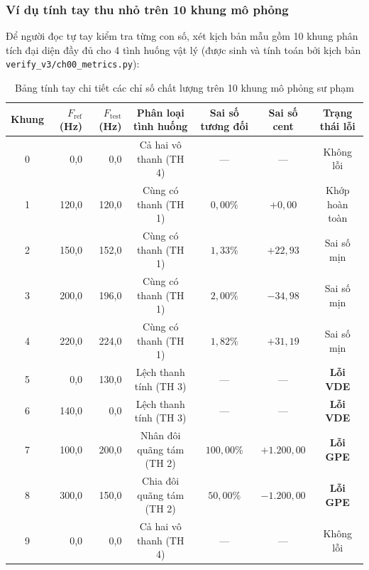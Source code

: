\subsubsection*{Ví dụ tính tay thu nhỏ trên 10 khung mô phỏng}
Để người đọc tự tay kiểm tra từng con số, xét kịch bản mẫu gồm 10 khung phân tích đại diện đầy đủ cho 4 tình huống vật lý (được sinh và tính toán bởi kịch bản \texttt{verify\_v3/ch00\_metrics.py}):
\begin{table}[H]
\centering
\small
\caption{Bảng tính tay chi tiết các chỉ số chất lượng trên 10 khung mô phỏng sư phạm}
\label{tab:ch00_metrics_10}
\begin{tabular}{crrcccc}
\toprule
Khung & $F_{\text{ref}}$ (Hz) & $F_{\text{test}}$ (Hz) & Phân loại tình huống & Sai số tương đối & Sai số cent & Trạng thái lỗi \\
\midrule
0 & 0,0 & 0,0 & Cả hai vô thanh (TH 4) & --- & --- & Không lỗi \\
1 & 120,0 & 120,0 & Cùng có thanh (TH 1) & $0{,}00\%$ & $+0{,}00$ & Khớp hoàn toàn \\
2 & 150,0 & 152,0 & Cùng có thanh (TH 1) & $1{,}33\%$ & $+22{,}93$ & Sai số mịn \\
3 & 200,0 & 196,0 & Cùng có thanh (TH 1) & $2{,}00\%$ & $-34{,}98$ & Sai số mịn \\
4 & 220,0 & 224,0 & Cùng có thanh (TH 1) & $1{,}82\%$ & $+31{,}19$ & Sai số mịn \\
5 & 0,0 & 130,0 & Lệch thanh tính (TH 3) & --- & --- & \textbf{Lỗi VDE} \\
6 & 140,0 & 0,0 & Lệch thanh tính (TH 3) & --- & --- & \textbf{Lỗi VDE} \\
7 & 100,0 & 200,0 & Nhân đôi quãng tám (TH 2) & $100{,}00\%$ & $+1.200{,}00$ & \textbf{Lỗi GPE} \\
8 & 300,0 & 150,0 & Chia đôi quãng tám (TH 2) & $50{,}00\%$ & $-1.200{,}00$ & \textbf{Lỗi GPE} \\
9 & 0,0 & 0,0 & Cả hai vô thanh (TH 4) & --- & --- & Không lỗi \\
\bottomrule
\end{tabular}
\end{table}

